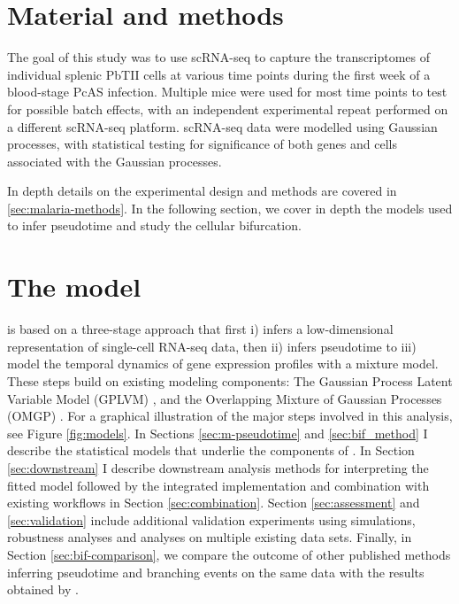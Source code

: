 \section{Material and methods}

The goal of this study was to use scRNA-seq to capture the transcriptomes of individual splenic PbTII cells at various time points during the first week of a blood-stage PcAS infection. Multiple mice were used for most time points to test for possible batch effects, with an independent experimental repeat performed on a different scRNA-seq platform. scRNA-seq data were modelled using Gaussian processes, with statistical testing for significance of both genes and cells associated with the Gaussian processes.

In depth details on the experimental design and methods are covered in \ref{sec:malaria-methods}. In the following section, we cover in depth the models used to infer pseudotime and study the cellular bifurcation.

\section{The  model}

 is based on a three-stage approach that first i) infers a low-dimensional representation of single-cell RNA-seq data, then ii) infers pseudotime to iii) model the temporal dynamics of gene expression profiles with a mixture model. These steps build on existing modeling components: The Gaussian Process Latent Variable Model (GPLVM) \cite{Lawrence2006-it}, and the Overlapping Mixture of Gaussian Processes (OMGP) \cite{Lazaro-Gredilla2012-ta}. For a graphical illustration of the major steps involved in this analysis, see Figure \ref{fig:models}. In Sections \ref{sec:m-pseudotime} and \ref{sec:bif_method} I describe the statistical models that underlie the components of . In Section \ref{sec:downstream} I describe downstream analysis methods for interpreting the fitted model followed by the integrated implementation and combination with existing workflows in Section \ref{sec:combination}. Section \ref{sec:assessment} 
and \ref{sec:validation} include additional validation experiments using simulations, robustness analyses and analyses on multiple existing data sets. Finally, in Section \ref{sec:bif-comparison}, we compare the outcome of other published methods inferring pseudotime and branching events on the same data with the results obtained by .

